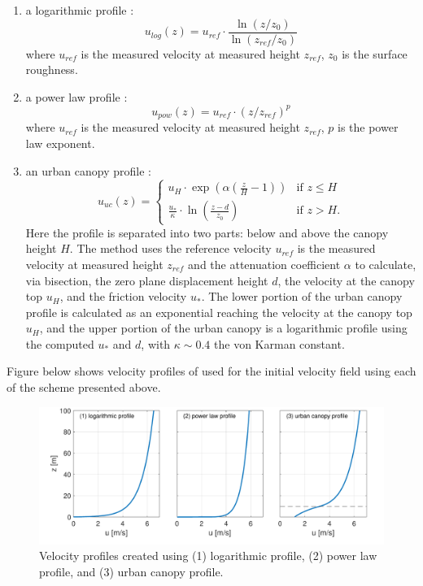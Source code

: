 \begin{enumerate}
\item a logarithmic profile \cite{favaloro2008toward}:
\begin{equation}
\label{eq:log_law}
u_{log}(z) = u_{ref}\cdot\frac{\ln(z/z_0)}{\ln(z_{ref}/z_0)}
\end{equation}
where $u_{ref}$ is the measured velocity at measured height $z_{ref}$, $z_0$ is the surface roughness.
\item a power law profile \cite{favaloro2008toward}:
\begin{equation}
\label{eq:power_law}
u_{pow}(z) = u_{ref}\cdot(z/z_{ref})^{p}
\end{equation}
where $u_{ref}$ is the measured velocity at measured height $z_{ref}$, $p$ is the power law exponent.

\item an urban canopy profile \cite{favaloro2008toward,pardyjak2008near}:
\begin{equation}
\label{eq:urban_canopy_low}
u_{uc}(z)=\begin{cases}
u_H\cdot\exp(\alpha(\frac{z}{H}-1)) & \text{if } z\leq H\\
\frac{u_*}{\kappa}\cdot \ln(\frac{z-d}{z_0}) & \text{if } z > H.
\end{cases}
\end{equation}
Here the profile is separated into two parts: below and above the canopy height $H$. The method uses the reference velocity $u_{ref}$ is the measured velocity at measured height $z_{ref}$ and the attenuation coefficient $\alpha$ to calculate, via bisection, the zero plane displacement height $d$, the velocity at the canopy top $u_H$, and the friction velocity $u_*$. The lower portion of the urban canopy profile is calculated as an exponential reaching the velocity at the canopy top $u_H$, and the upper portion of the urban canopy is a logarithmic profile using the computed $u_*$ and $d$, with $\kappa \sim 0.4$ the von Karman constant. 

\end{enumerate}

Figure below shows velocity profiles of used for the initial velocity field using each of the scheme presented above.

\begin{figure}[h]
    \centering
    \includegraphics[width=\textwidth]{Images/VelocityProfiles.pdf}
    \caption{Velocity profiles created using (1) logarithmic profile, (2) power law profile, and (3) urban canopy profile.}
\end{figure}

